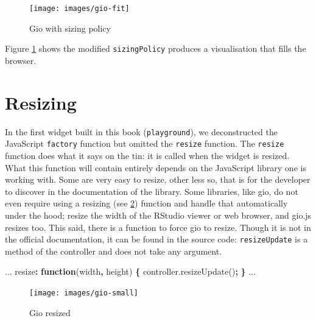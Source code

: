\documentclass[10pt,]{krantz}
\makeatletter
\newenvironment{Shaded}{\begin{snugshade}}{\end{snugshade}}
\newcommand{\AttributeTok}[1]{\textcolor[rgb]{0.61,0.61,0.61}{#1}}
\newcommand{\KeywordTok}[1]{\textcolor[rgb]{0.27,0.27,0.27}{\textbf{#1}}}
\newcommand{\NormalTok}[1]{#1}
\newcommand{\OperatorTok}[1]{\textcolor[rgb]{0.43,0.43,0.43}{\textbf{#1}}}
\newcommand{\VariableTok}[1]{\textcolor[rgb]{0,0,0}{#1}}
\newenvironment{kframe}{%
\medskip{}
\setlength{\fboxsep}{.8em}
 \def\at@end@of@kframe{}%
 \ifinner\ifhmode%
  \def\at@end@of@kframe{\end{minipage}}%
  \begin{minipage}{\columnwidth}%
 \fi\fi%
 \def\FrameCommand##1{\hskip\@totalleftmargin \hskip-\fboxsep
 \colorbox{shadecolor}{##1}\hskip-\fboxsep
     \hskip-\linewidth \hskip-\@totalleftmargin \hskip\columnwidth}%
 \MakeFramed {\advance\hsize-\width
   \@totalleftmargin\z@ \linewidth\hsize
   \@setminipage}}%
 {\par\unskip\endMakeFramed%
 \at@end@of@kframe}
\renewenvironment{Shaded}{\begin{kframe}}{\end{kframe}}
\makeatother
\begin{document}
\begin{figure}[H]

{\centering \texttt{[image: images/gio-fit]} 

}

\caption{Gio with sizing policy}\label{fig:gio-fit}
\end{figure}

Figure \ref{fig:gio-fit} shows the modified \texttt{sizingPolicy} produces a visualisation that fills the browser.

\hypertarget{widgets-adv-resizing}{%
\section{Resizing}\label{widgets-adv-resizing}}

In the first widget built in this book (\texttt{playground}), we deconstructed the JavaScript \texttt{factory} function but omitted the \texttt{resize} function. The \texttt{resize} function does what it says on the tin: it is called when the widget is resized. What this function will contain entirely depends on the JavaScript library one is working with. Some are very easy to resize, other less so, that is for the developer to discover in the documentation of the library. Some libraries, like gio, do not even require using a resizing (see \ref{fig:gio-small}) function and handle that automatically under the hood; resize the width of the RStudio viewer or web browser, and gio.js resizes too. This said, there is a function to force gio to resize. Though it is not in the official documentation, it can be found in the source code: \texttt{resizeUpdate} is a method of the controller and does not take any argument.

\begin{Shaded}
\begin{Highlighting}[]
\NormalTok{...}
\NormalTok{resize}\OperatorTok{:} \KeywordTok{function}\NormalTok{(width}\OperatorTok{,}\NormalTok{ height) }\OperatorTok{\{}
  \VariableTok{controller}\NormalTok{.}\AttributeTok{resizeUpdate}\NormalTok{()}\OperatorTok{;}
\OperatorTok{\}}
\NormalTok{...}
\end{Highlighting}
\end{Shaded}

\begin{figure}[H]

{\centering \texttt{[image: images/gio-small]} 

}

\caption{Gio resized}\label{fig:gio-small}
\end{figure}
\end{document}
